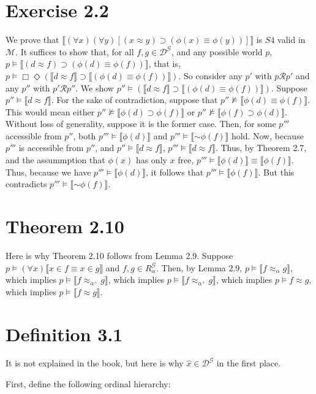 \documentclass{article}
\newcommand*{\oldneg}{\mathord{\sim}}
\newcommand{\lbc}{\llbracket}
\newcommand{\rbc}{\rrbracket}
\theoremstyle{definition}
\begin{document}
\section*{Exercise 2.2}
We prove that $\lbc(\forall x)(\forall y)[(x\approx y)\supset(\phi(x)\equiv\phi(y))]\rbc$ is $S4$ valid 
in $\mathcal{M}$. It suffices to show that, for all $f,g\in\mathcal{D}^\mathcal{G}$, and any possible world $p$, 
$p\vDash\lbc(d\approx f)\supset(\phi(d)\equiv\phi(f))\rbc$, that is,
$p\vDash\Box\Diamond(\lbc d\approx f\rbc\supset\lbc(\phi(d)\equiv\phi(f))\rbc)$. So consider any 
$p'$ with $p\mathcal{R}p'$ and any $p''$ with $p'\mathcal{R}p''$. We show
$p''\vDash(\lbc d\approx f\rbc\supset\lbc (\phi(d)\equiv\phi(f))\rbc)$. Suppose
$p''\vDash \lbc d\approx f\rbc$. For the sake of contradiction, suppose that 
$p''\nvDash\lbc\phi(d)\equiv\phi(f)\rbc$. This would mean either 
$p''\nvDash\lbc\phi(d)\supset\phi(f)\rbc$ or $p''\nvDash\lbc\phi(f)\supset\phi(d)\rbc$. Without loss of 
generality, suppose it is the former case. Then, for some $p'''$ accessible from $p''$, 
both $p'''\vDash\lbc\phi(d)\rbc$ and $p'''\vDash\lbc\oldneg\phi(f)\rbc$ hold. Now, because 
$p'''$ is accessible from $p''$, and $p''\vDash\lbc d\approx f\rbc$, $p'''\vDash\lbc d\approx f\rbc$. Thus, by 
Theorem 2.7, and the assummption that $\phi(x)$ has only $x$ free, 
$p'''\vDash\lbc\phi(d)\rbc\equiv\lbc\phi(f)\rbc$. Thus, because we have $p'''\vDash\lbc\phi(d)\rbc$, it follows 
that $p'''\vDash\lbc\phi(f)\rbc$. But this contradicts $p'''\vDash\lbc\oldneg\phi(f)\rbc$.

\section*{Theorem 2.10}
Here is why Theorem 2.10 follows from Lemma 2.9. Suppose 
$p\vDash(\forall x)\lbc x\in f\equiv x\in g\rbc$ and $f,g\in R^\mathcal{G}_\alpha$. Then, by Lemma 2.9,
$p\vDash\lbc f\approx_\alpha g\rbc$, which implies $p\vDash \lbc f\approx_{\alpha^+} g\rbc$, which implies 
$p\vDash \lbc f\approx_{\alpha^+} g\rbc$, which implies $p\vDash f\approx g$, which implies 
$p\vDash \lbc f\approx g\rbc$.

\section*{Definition 3.1}
It is not explained in the book, but here is why $\hat{x}\in\mathcal{D}^\mathcal{G}$ in the first place.

First, define the following ordinal hierarchy:
\end{document}
